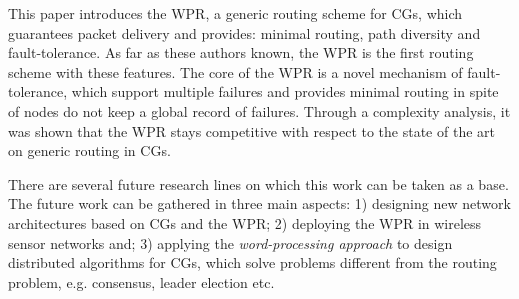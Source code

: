 This paper introduces the WPR,  a generic routing scheme for CGs, which guarantees packet delivery and provides: minimal routing, path diversity and fault-tolerance. As far as these authors known, the WPR is the first routing scheme with these features. The core of the WPR is a novel mechanism of fault-tolerance, which  support multiple failures and provides minimal routing in spite of nodes do not keep a global record of failures. Through a complexity analysis, it was shown that the WPR stays competitive with respect to  the state of the art on generic routing in CGs. 

There are several future research lines on which this work can be taken as a base. The future work can be gathered in three main aspects: 1) designing new network architectures based on CGs and the WPR; 2) deploying the WPR in wireless sensor networks and; 3) applying the \textit{word-processing approach} to design distributed algorithms for CGs, which solve problems different from the routing problem, e.g. consensus, leader election etc.
